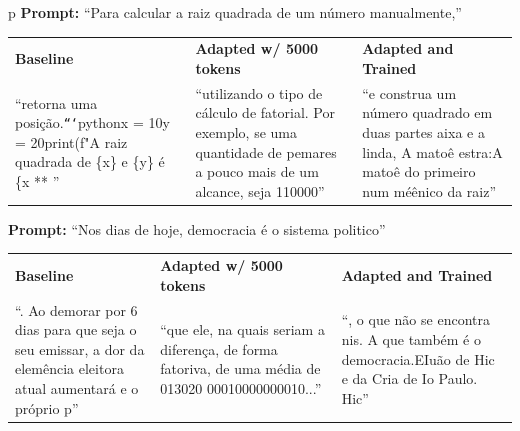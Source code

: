 {
    \newcommand{\prompt}[1]{\textcolor{promptcolor}{#1}}
    \newcommand{\generation}[1]{%
      {\RaggedRight\arraybackslash\color{generationcolor}\sloppy\footnotesize #1\hspace{0pt}\par}%
    }
    \begin{table}[h]
        \centering
        \begin{tabular}{p{\linewidth}}
            \toprule
            \textbf{Prompt:} \prompt{``Para calcular a raiz quadrada de um número manualmente,''} \\
            \begin{tabularx}{\hsize}{X|X|X}
            \midrule
                \textbf{Baseline} & \textbf{Adapted w/ 5000 tokens} & \textbf{Adapted and Trained} \\
                \generation{``retorna uma posição.\newline \texttt{```}python\newline x = 10\newline y = 20\newline print(f"A raiz quadrada de \{x\} e \{y\} é \{x ** ''} & \generation{``utilizando o \newline tipo de cálculo de fatorial. Por exemplo, se uma quantidade de \newline pemares a pouco mais de um alcance, seja 110000''} & \generation{``\newline e construa um número quadrado em duas partes \newline aixa e a linda, \newline A matoê estra:\newline A matoê do primeiro num méênico da raiz''} \\
            \midrule
            \end{tabularx}
            \textbf{Prompt:} \prompt{``Nos dias de hoje, democracia é o sistema politico''} \\
            \begin{tabularx}{\hsize}{X|X|X}
            \midrule
                \textbf{Baseline} & \textbf{Adapted w/ 5000 tokens} & \textbf{Adapted and Trained} \\
                \generation{``. Ao \newline demorar por 6 dias para que seja o seu emissar, a dor da elemência eleitora \newline atual aumentará e o próprio p''} & \generation{``que ele, na quais seriam \newline a diferença, de forma fatoriva, de uma média de 013020 00010000000010...''} & \generation{``, o que não se encontra nis. A que também é o democracia.\newline EIuão de Hic e da Cria de Io Paulo. \newline Hic''} \\

\end{tabularx}
\end{tabular}
\end{table}}
